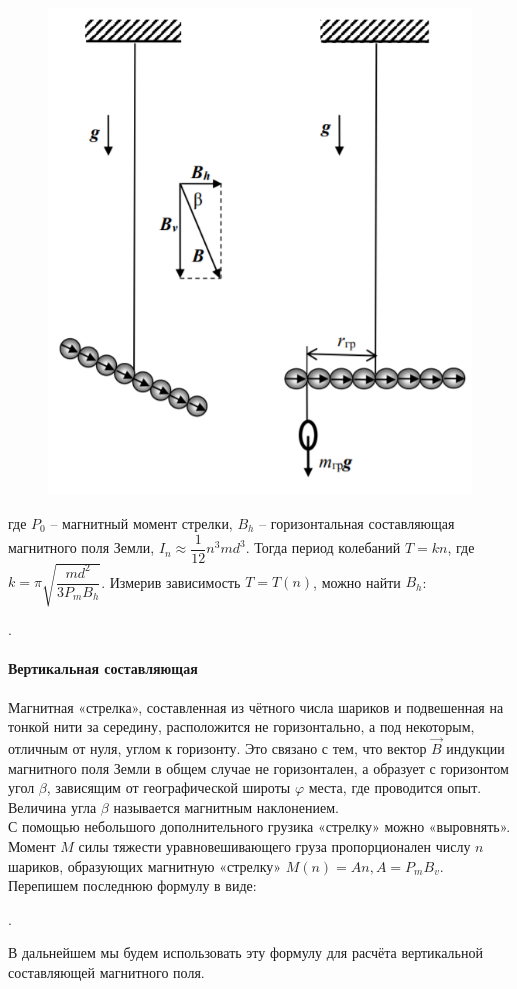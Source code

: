 \begin{figure}
\includegraphics[scale=0.5]{2.png}
\vspace{-10pt}
\end{figure}
где $P_0$ -- магнитный момент стрелки, $B_h$ -- горизонтальная составляющая магнитного поля Земли, $I_n \approx \dfrac{1}{12}n^3 m d^3$.
\n\n
Тогда период колебаний $T = kn$, где $k = \pi \sqrt{\dfrac{md^2}{3P_m B_h}}$. Измерив зависимость $T=T(n)$, можно найти $B_h$:
\begin{center}
 .
\end{center}

\paragraph*{Вертикальная составляющая}
\n
Магнитная «стрелка», составленная из чётного числа
шариков и подвешенная на тонкой нити за середину, расположится не горизонтально, а под некоторым, отличным от нуля, углом к горизонту. Это связано с тем, что вектор $\vec{B}$ индукции магнитного поля Земли в общем случае не горизонтален, а образует с горизонтом
угол $\beta$, зависящим от географической широты $\varphi$
места, где проводится опыт. Величина угла $\beta$
называется магнитным наклонением.\\
С помощью небольшого дополнительного грузика «стрелку» можно «выровнять». Момент $M$ силы тяжести уравновешивающего груза пропорционален числу $n$ шариков, образующих магнитную «стрелку» $M(n) = An, A=P_m B_v$. Перепишем последнюю формулу в виде:
\begin{center}
 .
\end{center}
В дальнейшем мы будем использовать эту формулу для расчёта вертикальной составляющей магнитного поля.

